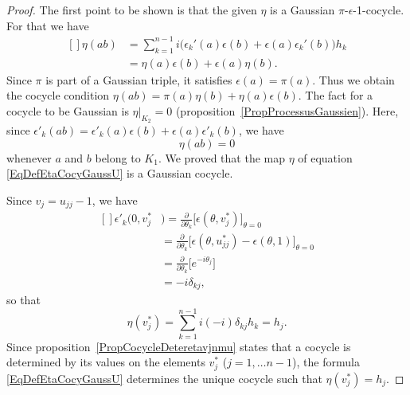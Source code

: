 \begin{proof}

    The first point to be shown is that the given $\eta$ is a Gaussian $\pi$-$\epsilon$-1-cocycle. For that we have
    \begin{equation}
        \begin{aligned}[]
            \eta(ab)&=\sum_{k=1}^{n-1}i\Big( \epsilon_k'(a)\epsilon(b)+\epsilon(a)\epsilon_k'(b) \Big)h_k\\
            &=\eta(a)\epsilon(b)+\epsilon(a)\eta(b).
        \end{aligned}
    \end{equation}
    Since $\pi$ is part of a Gaussian triple, it satisfies $\epsilon(a)=\pi(a)$. Thus we obtain the cocycle condition $\eta(ab)=\pi(a)\eta(b)+\eta(a)\epsilon(b)$. The fact for a cocycle to be Gaussian is $\eta|_{K_2}=0$ (proposition~\ref{PropProcessusGaussien}). Here, since $\epsilon'_k(ab)=\epsilon'_k(a)\epsilon(b)+\epsilon(a)\epsilon'_k(b)$, we have
    \begin{equation}
        \eta(ab)=0
    \end{equation}
    whenever $a$ and $b$ belong to $K_1$. We proved that the map $\eta$ of equation \eqref{EqDefEtaCocyGaussU} is a Gaussian cocycle.

    Since $v_j=u_{jj}-1$, we have
    \begin{equation}
        \begin{aligned}[]
            \epsilon'_k(0,v_j^*&)=\frac{ \partial  }{ \partial \theta_k }\big[ \epsilon(\theta,v_j^*) \big]_{\theta=0}\\
            &=\frac{ \partial  }{ \partial \theta_k }\big[ \epsilon(\theta,u_{jj}^*)-\epsilon(\theta,1) \big]_{\theta=0}\\
            &=\frac{ \partial  }{ \partial \theta_k }\big[  e^{-i\theta_j} \big]\\
            &=-i\delta_{kj},
        \end{aligned}
    \end{equation}
    so that
    \begin{equation}
        \eta(v_j^*)=\sum_{k=1}^{n-1}i(-i)\delta_{kj}h_k=h_j.
    \end{equation}
    Since proposition~\ref{PropCocycleDeteretavjnmu} states that a cocycle is determined by its values on the elements $v_j^*$ ($j=1,\ldots n-1$), the formula \eqref{EqDefEtaCocyGaussU} determines the unique cocycle such that $\eta(v_j^*)=h_j$.
\end{proof}



